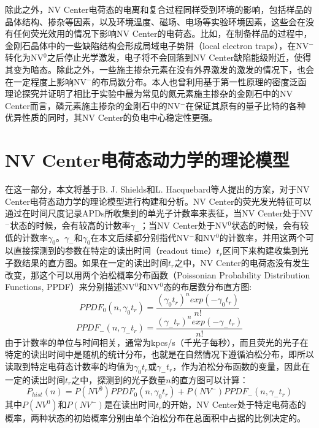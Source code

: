 \documentclass[type = bachelor]{whu-thesis}
\begin{document}
除此之外，NV Center电荷态的电离和复合过程同样受到环境的影响，包括样品的晶体结构、掺杂等因素，以及环境温度、磁场、电场等实验环境因素，这些会在没有任何荧光效用的情况下影响NV Center的电荷态。比如，在制备样品的过程中，金刚石晶体中的一些缺陷结构会形成局域电子势阱（local electron traps），在NV$^-$转化为NV$^0$之后停止光学激发，电子将不会回落到NV Center缺陷能级附近，使得其变为暗态\cite{Bluvstein2019}。除此之外，一些施主掺杂元素在没有外界激发的激发的情况下，也会在一定程度上影响NV$^-$的布局数分布\cite{doi2016pure}。本人也曾利用基于第一性原理的密度泛函理论探究并证明了相比于实验中最为常见的氮元素施主掺杂的金刚石中的NV Center而言，磷元素施主掺杂的金刚石中的NV$^-$在保证其原有的量子比特的各种优异性质的同时，其NV Center的负电中心稳定性更强\cite{Zou2024}。

\section{NV Center电荷态动力学的理论模型}
在这一部分，本文将基于B. J. Shields和L. Hacquebard等人提出的方案，对于NV Center电荷态动力学的理论模型进行构建和分析\cite{Shields2015, Hacquebard2018}。NV Center的荧光发光特征可以通过在时间尺度记录APDs所收集到的单光子计数率来表征，当NV Center处于NV$^-$状态的时候，会有较高的计数率$\gamma_-$；当NV Center处于NV$^0$状态的时候，会有较低的计数率$\gamma_0$。$\gamma_-$和$\gamma_0$在本文后续都分别指代NV$^-$和NV$^0$的计数率，并用这两个可以直接探测到的参数在特定的读出时间（readout time）$t_r$区间下来构建收集到光子数结果的直方图。如果在一定的读出时间$t_r$之中，NV Center的电荷态没有发生改变，那这个可以用两个泊松概率分布函数（Poissonian Probability Distribution Functions, PPDF）来分别描述NV$^0$和NV$^0$态的布居数分布直方图:
\begin{equation}
  PPDF_0(n, \gamma_0 t_r) = \frac{(\gamma_0 t_r)^n exp(-\gamma_0 t_r)}{n!}
  \label{equ: PPDF_0}
\end{equation}
\begin{equation}
  PPDF_-(n, \gamma_- t_r) = \frac{(\gamma_- t_r)^n exp(-\gamma_- t_r)}{n!}
  \label{equ: PPDF_1}
\end{equation}
由于计数率的单位与时间相关，通常为kpcs/s（千光子每秒），而且荧光的光子在特定的读出时间中是随机的统计分布，也就是在自然情况下遵循泊松分布，即所以读取到特定电荷态计数率的均值为$\gamma_0 t_r$或$\gamma_- t_r$，作为泊松分布函数的变量，因此在一定的读出时间$t_r$之中，探测到的光子数量$n$的直方图可以计算：
\begin{equation}
P_{hist}(n)=P(NV^0)PPDF_0(n, \gamma_0 t_r)+P(NV^-)PPDF_-(n, \gamma_- t_r)
\end{equation}
其中$P(NV^0)$和$P(NV^-)$是在读出时间$t_r$的开始，NV Center处于特定电荷态的概率，两种状态的初始概率分别由单个泊松分布在总面积中占据的比例决定的。
\end{document}
